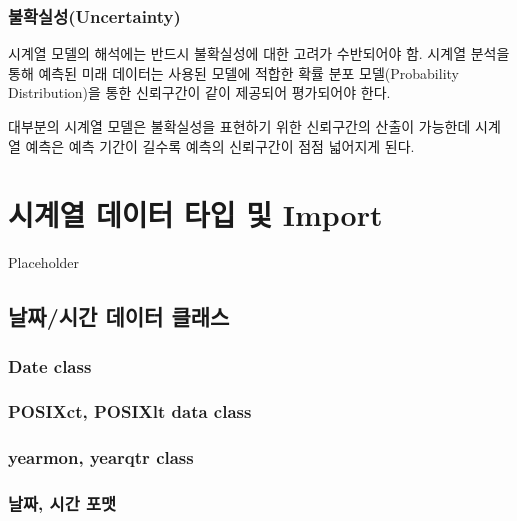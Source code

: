 \documentclass[
]{book}
\begin{document}
\hypertarget{uxbd88uxd655uxc2e4uxc131uncertainty}{%
\subsection{불확실성(Uncertainty)}\label{uxbd88uxd655uxc2e4uxc131uncertainty}}

시계열 모델의 해석에는 반드시 불확실성에 대한 고려가 수반되어야 함. 시계열 분석을 통해 예측된 미래 데이터는 사용된 모델에 적합한 확률 분포 모델(Probability Distribution)을 통한 신뢰구간이 같이 제공되어 평가되어야 한다.

대부분의 시계열 모델은 불확실성을 표현하기 위한 신뢰구간의 산출이 가능한데 시계열 예측은 예측 기간이 길수록 예측의 신뢰구간이 점점 넓어지게 된다.

\hypertarget{uxc2dcuxacc4uxc5f4-uxb370uxc774uxd130-uxd0c0uxc785-uxbc0f-import}{%
\chapter{시계열 데이터 타입 및 Import}\label{uxc2dcuxacc4uxc5f4-uxb370uxc774uxd130-uxd0c0uxc785-uxbc0f-import}}

Placeholder

\hypertarget{uxb0a0uxc9dcuxc2dcuxac04-uxb370uxc774uxd130-uxd074uxb798uxc2a4}{%
\section{날짜/시간 데이터 클래스}\label{uxb0a0uxc9dcuxc2dcuxac04-uxb370uxc774uxd130-uxd074uxb798uxc2a4}}

\hypertarget{date-class}{%
\subsection{Date class}\label{date-class}}

\hypertarget{posixct-posixlt-data-class}{%
\subsection{POSIXct, POSIXlt data class}\label{posixct-posixlt-data-class}}

\hypertarget{yearmon-yearqtr-class}{%
\subsection{yearmon, yearqtr class}\label{yearmon-yearqtr-class}}

\hypertarget{uxb0a0uxc9dc-uxc2dcuxac04-uxd3ecuxb9f7}{%
\subsection{날짜, 시간 포맷}\label{uxb0a0uxc9dc-uxc2dcuxac04-uxd3ecuxb9f7}}
\end{document}
